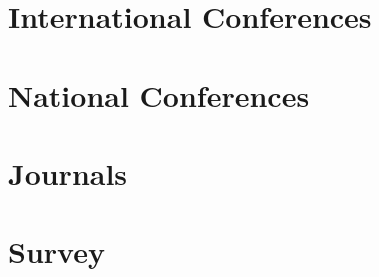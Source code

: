 \section{International Conferences}

\section{National Conferences}

\section{Journals}

\section{Survey}
